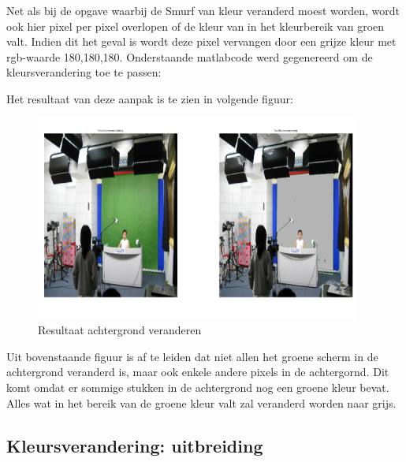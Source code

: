 		\par Net als bij de opgave waarbij de Smurf van kleur veranderd moest worden, wordt ook hier pixel per pixel overlopen of de kleur van in het kleurbereik van groen valt.
		Indien dit het geval is wordt deze pixel vervangen door een grijze kleur met rgb-waarde 180,180,180. Onderstaande matlabcode werd gegenereerd om de kleursverandering toe 
		te passen: \bigskip
		
			
		
		\newpage
		
		\par Het resultaat van deze aanpak is te zien in volgende figuur:
			
				\begin{figure}[H]
				\centering
				\includegraphics[width=0.95\textwidth]{Images/resultaat_chromakey.png}
				\caption{Resultaat achtergrond veranderen}
				\label{fig:achtergrond_veranderen}
				\end{figure}
		
		\par Uit bovenstaande figuur is af te leiden dat niet allen het groene scherm in de achtergrond veranderd is, maar ook enkele andere pixels in de achtergornd. Dit komt omdat
		er sommige stukken in de achtergrond nog een groene kleur bevat. Alles wat in het bereik van de groene kleur valt zal veranderd worden naar grijs.
		\noindent
		
		
		
		\subsection{Kleursverandering: uitbreiding}
		
